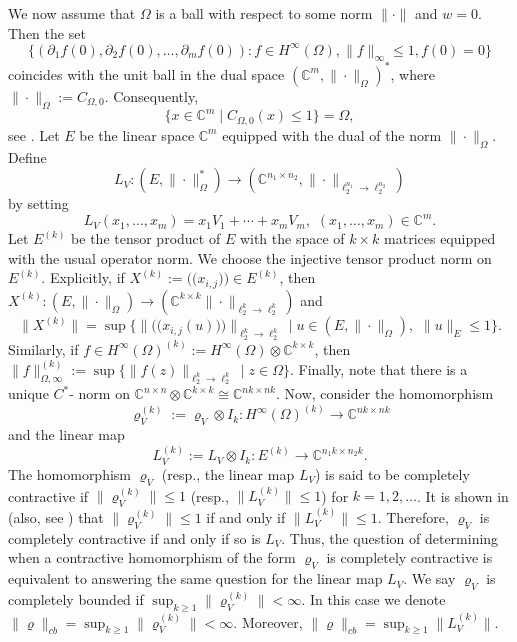 \documentclass[a4paper,oneside,11pt, reqno]{amsart}
\numberwithin{equation}{section}
\theoremstyle{plain}
\begin{document}
We now assume that $\Omega$ is a ball with respect to some norm $\| \cdot \|$ and $w=0$. Then the set
\[\big \{\left(\partial_1 f(0), \partial_2 f(0), \ldots, \partial_m f(0)\right): f \in H^\infty(\Omega), \|f\|_\infty \leqslant 1, f(0)=0\big\}\]
coincides with the unit ball in the dual space $(\mathbb{C}^m, \|\cdot \|_\Omega)^*$,  where $\|\cdot\|_\Omega:= C_{\Omega,0}$. Consequently, 
\[\{x\in \mathbb{C}^m \mid C_{\Omega,0}(x) \leqslant 1\}=\Omega,\] see \cite[Lemma 2.2]{Misra19}. Let $E$ be the linear space $\mathbb{C}^m$ equipped with the dual of the norm $\|\cdot\|_\Omega$. Define 
\[L_V:(E, \|\cdot\|_\Omega^*) \to (\mathbb{C}^{n_1\times n_2}, \|\cdot \|_{\ell_2^{n_1} \to \ell_2^{n_2}})\] by setting 
\[L_V(x_1, \ldots , x_m)= x_1 V_1 + \cdots + x_m V_m,\,\, (x_1, \ldots , x_m)\in \mathbb{C}^m.\] 
Let  $E^{(k)}$ be the tensor product of $E$ with the space of $k\times k$ matrices  equipped with the usual operator norm. We choose 
the injective tensor product norm on $E^{(k)}$. Explicitly,  
if $X^{(k)}:=\big (\!\!\big ( x_{i,j} \big )\!\!\big ) \in  E^{(k)}$, then $X^{(k)}:(E, \|\cdot\|_\Omega) \to (\mathbb{C}^{k\times k}\|\cdot\|_{\ell_2^k \to \ell_2^k})$ and
\[ \|X^{(k)}\|=\sup \big \{\|\big (\!\!\big ( x_{i,j}(u)\big )\!\!\big )\|_{\ell^k_2 \to \ell^k_2}\mid u\in (E, \|\cdot\|_\Omega),\,\, \|u\|_E \leqslant 1\big \}.\] 
Similarly, if $f\in H^\infty(\Omega)^{(k)}:= H^\infty(\Omega)\otimes \mathbb{C}^{k\times k}$, then $\|f\|_{\Omega, \infty}^{(k)}:=\sup\{\|f(z)\|_{\ell_2^k \to \ell_2^k}\mid z\in \Omega\}$. Finally, note that there is a unique $C^*$- norm on $\mathbb{C}^{n \times n } \otimes \mathbb{C}^{k\times k}\cong \mathbb{C}^{n k \times n k}$. Now, consider the homomorphism 
\[\varrho_V^{(k)}:=\varrho_V\otimes I_k:  H^\infty(\Omega)^{(k)} \to \mathbb{C}^{n k \times n k}\] 
and the linear map 
\[L^{(k)}_V:= L_V\otimes I_k: E^{(k)} \to \mathbb{C}^{n_1 k \times n_2 k}.\] 
The homomorphism  $\varrho_V$ (resp., the linear map $L_V$) is said to be completely contractive if $\|\varrho^{(k)}_V\| \leqslant 1$ (resp., $\|L_V^{(k)}\| \leqslant 1$) for $k=1,2, \ldots $. It is shown in \cite[Lemma 3.3]{Misra94} (also, see \cite[Lemma 5.1]{vip}) that 
$\|\varrho_V^{(k)}\| \leqslant 1$ if and only if $\|L_V^{(k)}\| \leqslant 1$.  Therefore, $\varrho_V$ is completely contractive if and only if so is $L_V$. Thus, the question of determining when a contractive homomorphism of the form $\varrho_V$ is completely contractive is equivalent to answering the same question for the 
linear map $L_V$. We  say $\varrho_V$ is completely bounded if $\sup_{k\geq 1}\|\varrho_V^{(k)}\|<\infty$. In this case we denote $\|\varrho\|_{cb}=\sup_{k\geq 1}\|\varrho_V^{(k)}\|<\infty.$ Moreover, $\|\varrho\|_{cb}=\sup_{k\geq 1}\|L_V^{(k)}\|.$
\end{document}
